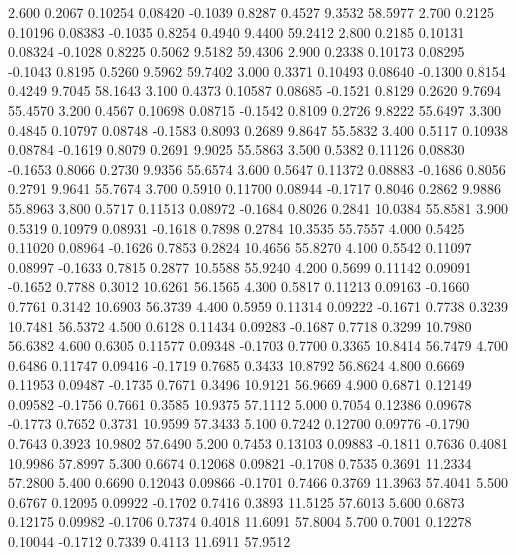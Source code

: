    2.600   0.2067   0.10254   0.08420  -0.1039   0.8287   0.4527   9.3532  58.5977
   2.700   0.2125   0.10196   0.08383  -0.1035   0.8254   0.4940   9.4400  59.2412
   2.800   0.2185   0.10131   0.08324  -0.1028   0.8225   0.5062   9.5182  59.4306
   2.900   0.2338   0.10173   0.08295  -0.1043   0.8195   0.5260   9.5962  59.7402
   3.000   0.3371   0.10493   0.08640  -0.1300   0.8154   0.4249   9.7045  58.1643
   3.100   0.4373   0.10587   0.08685  -0.1521   0.8129   0.2620   9.7694  55.4570
   3.200   0.4567   0.10698   0.08715  -0.1542   0.8109   0.2726   9.8222  55.6497
   3.300   0.4845   0.10797   0.08748  -0.1583   0.8093   0.2689   9.8647  55.5832
   3.400   0.5117   0.10938   0.08784  -0.1619   0.8079   0.2691   9.9025  55.5863
   3.500   0.5382   0.11126   0.08830  -0.1653   0.8066   0.2730   9.9356  55.6574
   3.600   0.5647   0.11372   0.08883  -0.1686   0.8056   0.2791   9.9641  55.7674
   3.700   0.5910   0.11700   0.08944  -0.1717   0.8046   0.2862   9.9886  55.8963
   3.800   0.5717   0.11513   0.08972  -0.1684   0.8026   0.2841  10.0384  55.8581
   3.900   0.5319   0.10979   0.08931  -0.1618   0.7898   0.2784  10.3535  55.7557
   4.000   0.5425   0.11020   0.08964  -0.1626   0.7853   0.2824  10.4656  55.8270
   4.100   0.5542   0.11097   0.08997  -0.1633   0.7815   0.2877  10.5588  55.9240
   4.200   0.5699   0.11142   0.09091  -0.1652   0.7788   0.3012  10.6261  56.1565
   4.300   0.5817   0.11213   0.09163  -0.1660   0.7761   0.3142  10.6903  56.3739
   4.400   0.5959   0.11314   0.09222  -0.1671   0.7738   0.3239  10.7481  56.5372
   4.500   0.6128   0.11434   0.09283  -0.1687   0.7718   0.3299  10.7980  56.6382
   4.600   0.6305   0.11577   0.09348  -0.1703   0.7700   0.3365  10.8414  56.7479
   4.700   0.6486   0.11747   0.09416  -0.1719   0.7685   0.3433  10.8792  56.8624
   4.800   0.6669   0.11953   0.09487  -0.1735   0.7671   0.3496  10.9121  56.9669
   4.900   0.6871   0.12149   0.09582  -0.1756   0.7661   0.3585  10.9375  57.1112
   5.000   0.7054   0.12386   0.09678  -0.1773   0.7652   0.3731  10.9599  57.3433
   5.100   0.7242   0.12700   0.09776  -0.1790   0.7643   0.3923  10.9802  57.6490
   5.200   0.7453   0.13103   0.09883  -0.1811   0.7636   0.4081  10.9986  57.8997
   5.300   0.6674   0.12068   0.09821  -0.1708   0.7535   0.3691  11.2334  57.2800
   5.400   0.6690   0.12043   0.09866  -0.1701   0.7466   0.3769  11.3963  57.4041
   5.500   0.6767   0.12095   0.09922  -0.1702   0.7416   0.3893  11.5125  57.6013
   5.600   0.6873   0.12175   0.09982  -0.1706   0.7374   0.4018  11.6091  57.8004
   5.700   0.7001   0.12278   0.10044  -0.1712   0.7339   0.4113  11.6911  57.9512
